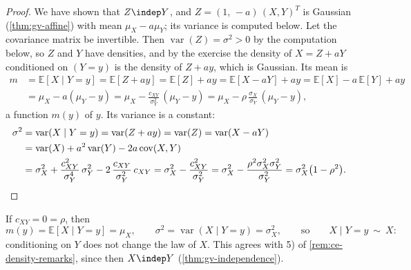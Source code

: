\begin{proof}
We have shown that $Z\indep Y$, and $Z=(1,\,-a)\,(X,Y)^T$ is Gaussian (\cref{thm:gv-affine}) with
mean $\mu_X-a\mu_Y$; its variance is computed below. Let the covariance matrix be invertible. Then
$\operatorname{var}(Z)=\sigma^2>0$ by the computation below, so $Z$ and $Y$ have densities, and by the
exercise the density of $X=Z+aY$ conditioned on $(Y=y)$ is the density of $Z+ay$, which is Gaussian.
Its mean is
\[
\begin{aligned}
  m&=\mathbb E[X\mid Y=y]=\mathbb E[Z+ay]=\mathbb E[Z]+ay=\mathbb E[X-aY]+ay=\mathbb E[X]-a\,\mathbb E[Y]+ay\\
  &=\mu_X-a(\mu_Y-y)=\mu_X-\frac{c_{XY}}{\sigma_Y^2}\,(\mu_Y-y)=\mu_X-\rho\,\frac{\sigma_X}{\sigma_Y}\,(\mu_Y-y),
\end{aligned}
\]
a function $m(y)$ of $y$. Its variance is a constant:
\[
\begin{aligned}
  \sigma^2&=\operatorname{var}(X\mid Y=y)=\operatorname{var}(Z+ay)=\operatorname{var}(Z)=\operatorname{var}(X-aY)\\
  &=\operatorname{var}(X)+a^2\operatorname{var}(Y)-2a\operatorname{cov}(X,Y)\\
  &=\sigma_X^2+\frac{c_{XY}^2}{\sigma_Y^4}\,\sigma_Y^2-2\,\frac{c_{XY}}{\sigma_Y^2}\,c_{XY}
  =\sigma_X^2-\frac{c_{XY}^2}{\sigma_Y^2}
  =\sigma_X^2-\frac{\rho^2\sigma_X^2\sigma_Y^2}{\sigma_Y^2}=\sigma_X^2\big(1-\rho^2\big).\qedhere
\end{aligned}
\]
\end{proof}

\begin{remark}\label{rem:gc-uncorrelated}
If $c_{XY}=0=\rho$, then
\[
  m(y)=\mathbb E[X\mid Y=y]=\mu_X,\qquad\sigma^2=\operatorname{var}(X\mid Y=y)=\sigma_X^2,
  \qquad\text{so}\qquad X\mid Y=y\ \sim\ X:
\]
conditioning on $Y$ does not change the law of $X$. This agrees with 5) of
\cref{rem:ce-density-remarks}, since then $X\indep Y$ (\cref{thm:gv-independence}).
\end{remark}

